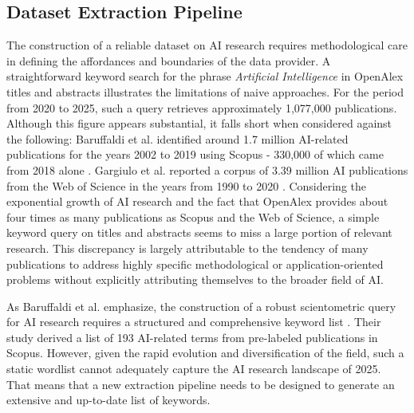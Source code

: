 \documentclass{article}
\begin{document}
	
	\subsection{Dataset Extraction Pipeline}
	\label{dataset_extraction_pipeline_chapter}
	
	The construction of a reliable dataset on AI research requires methodological care in defining the affordances and boundaries of the data provider. A straightforward keyword search for the phrase \textit{Artificial Intelligence} in OpenAlex titles and abstracts illustrates the limitations of naive approaches. For the period from 2020 to 2025, such a query retrieves approximately 1,077,000 publications. Although this figure appears substantial, it falls short when considered against the following: Baruffaldi et al. identified around 1.7 million AI-related publications for the years 2002 to 2019 using Scopus - 330,000 of which came from 2018 alone \cite{baruffaldi2020identifying}. Gargiulo et al. reported a corpus of 3.39 million AI publications from the Web of Science in the years from 1990 to 2020 \cite{gargiulo2022cartography}. Considering the exponential growth of AI research and the fact that OpenAlex provides about four times as many publications as Scopus and the Web of Science, a simple keyword query on titles and abstracts seems to miss a large portion of relevant research. This discrepancy is largely attributable to the tendency of many publications to address highly specific methodological or application-oriented problems without explicitly attributing themselves to the broader field of AI.
	
	As Baruffaldi et al. emphasize, the construction of a robust scientometric query for AI research requires a structured and comprehensive keyword list \cite{baruffaldi2020identifying}. Their study derived a list of 193 AI-related terms from pre-labeled publications in Scopus. However, given the rapid evolution and diversification of the field, such a static wordlist cannot adequately capture the AI research landscape of 2025. That means that a new extraction pipeline needs to be designed to generate an extensive and up-to-date list of keywords.
	
\end{document}
